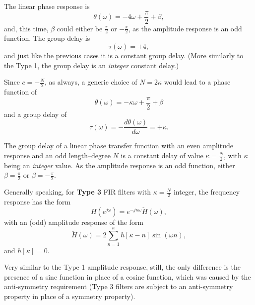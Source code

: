 \documentclass[\documentfontsize, twocolumn]{\classname}
\begin{document}
The linear phase response is
\[
    \theta(\omega) = -4\omega + \frac \pi 2 + \beta,
\]
and, this time, $\beta$ could either be $\frac \pi 2$ or $-\frac \pi 2$, as the amplitude response is an odd function. The group delay is
\[
    \tau(\omega) = +4,
\]
and just like the previous cases it is a constant group delay. (More similarly to the Type 1, the group delay is an \emph{integer} constant delay.)

Since $c=-\frac N 2$, as always, a generic choice of $N = 2\kappa$ would lead to a phase function of 
\begin{equation}\label{eqn:linearPhaseTypeIIIPhaseFunction}
    \theta(\omega) = -\kappa\omega + \frac \pi 2 + \beta
\end{equation}
and a group delay of
\begin{equation}\label{eqn:linearPhaseTypeIIIGroupDelay}
    \tau(\omega) = -\frac{d\theta(\omega)}{d\omega} = +\kappa.
\end{equation}

The group delay of a linear phase transfer function with an even amplitude response and an odd length--degree $N$ is a constant delay of value $\kappa = \frac {N}{2}$, with $\kappa$ being an \emph{integer} value. As the amplitude response is an odd function, either $\beta=\frac \pi 2$ or $\beta=-\frac \pi 2$.

Generally speaking, for \textbf{Type 3} FIR filters with $\kappa = \frac N 2$ integer, the frequency response has the form
\begin{equation}\label{eqn:linearPhaseTypeIIIResponse}
    H(e^{j\omega}) = e^{-j\kappa\omega}\breve{H}(\omega),
\end{equation}
with an (odd) amplitude response of the form
\begin{equation}\label{eqn:linearPhaseTypeIIIAmplitudeResponse}
    \breve{H}(\omega) = 2\sum_{n=1}^\kappa h[\kappa - n]\sin{(\omega n)},
\end{equation}
and $h[\kappa] = 0$.

Very similar to the Type 1 amplitude response, still, the only difference is the presence of a sine function in place of a cosine function, which was caused by the anti-symmetry requirement (Type 3 filters are subject to an anti-symmetry property in place of a symmetry property).
\end{document}
